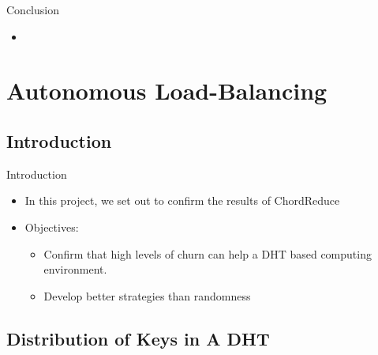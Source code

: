 \documentclass[11pt]{beamer}
\begin{document}
\begin{frame}{Conclusion}
\begin{itemize}
	\item 
\end{itemize}
\end{frame}

\section{Autonomous Load-Balancing}

\subsection{Introduction}
\begin{frame}{Introduction}
	\begin{itemize}
		
		\item In this project, we set out to confirm the results of ChordReduce
		\item Objectives:
		\begin{itemize}
			\item Confirm that high levels of churn can help a DHT based computing environment.
			\item Develop better strategies than randomness
		\end{itemize}
	\end{itemize}
\end{frame}


\subsection{Distribution of Keys in A DHT}
\end{document}
